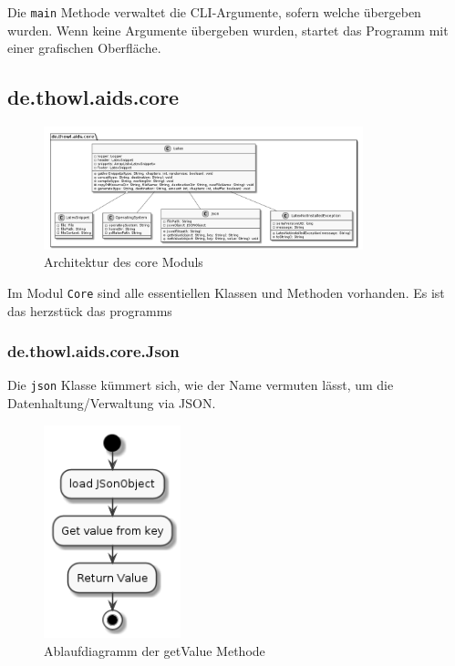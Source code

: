 \documentclass[stu, a4paper, 11pt, floatsintext]{apa7}
\begin{document}
\noindent Die \texttt{main} Methode verwaltet die CLI-Argumente, sofern welche übergeben wurden.
Wenn keine Argumente übergeben wurden, startet das Programm mit einer grafischen Oberfläche.

\subsection{de.thowl.aids.core}

\begin{figure}[!htbp]
\centering
\includegraphics[width=350px]{../technical_documentation/diagramm/uml/flowcharts/core/core.png}
\caption{\label{Core Architektur}Architektur des core Moduls}
\end{figure}

\noindent Im Modul \texttt{Core} sind alle essentiellen Klassen und Methoden vorhanden. Es ist das herzstück das programms

\subsubsection{de.thowl.aids.core.Json}

\noindent Die \texttt{json} Klasse kümmert sich, wie der Name vermuten lässt, um die Datenhaltung/Verwaltung via JSON.

\begin{figure}[!htbp]
\centering
\includegraphics[width=150px]{../technical_documentation/diagramm/uml/flowcharts/core/json/getValue.png}
\caption{\label{getValue-methode}Ablaufdiagramm der getValue Methode}
\end{figure}
\end{document}
